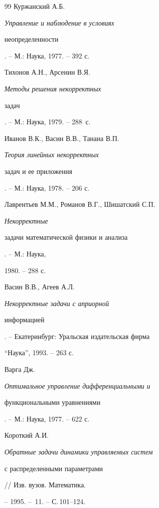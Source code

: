 \begin{thebibliography}{99}
Куржанский А.Б. {\em Управление и наблюдение в условиях 


неопределенности}. -- М.: Наука, 1977. -- 392 с. 




Тихонов А.Н., Арсенин В.Я. {\em Методы решения некорректных 


задач}. -- М.: Наука, 1979. -- 288~с.




Иванов В.К., Васин В.В., Танана В.П. {\em Теория линейных некорректных 


задач и ее приложения}. -- М.: Наука, 1978. -- 206 с. 




Лаврентьев М.М., Романов В.Г., Шишатский С.П. {\em Некорректные 


задачи математической физики и анализа}. -- М.: Наука, 


1980. -- 288 с. 




Васин В.В., Агеев А.Л. {\em Некорректные задачи с априорной 


информацией}. -- Екатеринбург: Уральская издательская фирма 


``Наука'', 1993. -- 263 с. 




Варга Дж. {\em Оптимальное управление дифференциальными и 


функциональными уравнениями}. -- М.: Наука, 1977. -- 622 с. 




Короткий А.И. {\em Обратные задачи динамики управляемых систем 


с распределенными параметрами} // Изв. вузов. Математика. 


-- 1995. -- \No\,11. -- С.\,101--124. 


 


\end{thebibliography} 


 


\vskip 2cm 


 








 


\label{end} 


 



